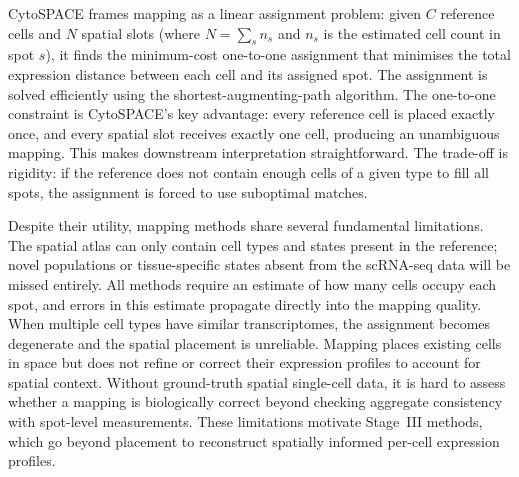 CytoSPACE \citep{vahid2023cytospace} frames mapping as a linear assignment problem: given $C$ reference cells and $N$ spatial slots (where $N = \sum_s n_s$ and $n_s$ is the estimated cell count in spot $s$), it finds the minimum-cost one-to-one assignment that minimises the total expression distance between each cell and its assigned spot. The assignment is solved efficiently using the shortest-augmenting-path algorithm. The one-to-one constraint is CytoSPACE's key advantage: every reference cell is placed exactly once, and every spatial slot receives exactly one cell, producing an unambiguous mapping. This makes downstream interpretation straightforward. The trade-off is rigidity: if the reference does not contain enough cells of a given type to fill all spots, the assignment is forced to use suboptimal matches.

Despite their utility, mapping methods share several fundamental limitations. The spatial atlas can only contain cell types and states present in the reference; novel populations or tissue-specific states absent from the scRNA-seq data will be missed entirely. All methods require an estimate of how many cells occupy each spot, and errors in this estimate propagate directly into the mapping quality. When multiple cell types have similar transcriptomes, the assignment becomes degenerate and the spatial placement is unreliable. Mapping places existing cells in space but does not refine or correct their expression profiles to account for spatial context. Without ground-truth spatial single-cell data, it is hard to assess whether a mapping is biologically correct beyond checking aggregate consistency with spot-level measurements. These limitations motivate Stage~III methods, which go beyond placement to reconstruct spatially informed per-cell expression profiles.
